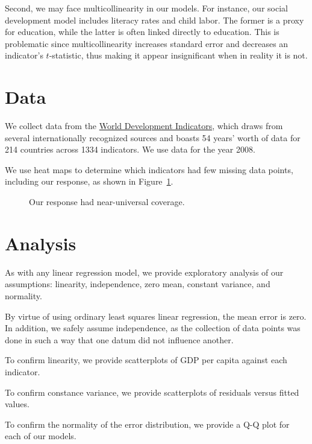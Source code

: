 \documentclass[12pt]{article}
\begin{document}
Second, we may face multicollinearity in our models. For instance, our social development model includes literacy rates and child labor. The former is a proxy for education, while the latter is often linked directly to education. This is problematic since multicollinearity increases standard error and decreases an indicator's $t$-statistic, thus making it appear insignificant when in reality it is not.




\section{Data}
We collect data from the \href{http://data.worldbank.org/indicator}{World Development Indicators}, 
which draws from several internationally recognized sources and boasts 54 years' worth of data for 214 countries across 1334 indicators.
We use data for the year 2008.\endnotemark[1]

We use heat maps to determine which indicators had few missing data points, including our response, as shown in Figure~\ref{gdp_per_capita_heat_map}.

\begin{figure}[h!]
\centering
\caption{\label{gdp_per_capita_heat_map}Our response had near-universal coverage.}
\end{figure}



\section{Analysis}
As with any linear regression model, we provide exploratory analysis of our assumptions: linearity, independence, zero mean, constant variance, and normality.

By virtue of using ordinary least squares linear regression, the mean error is zero. In addition, we safely assume independence, as the collection of data points was done in such a way that one datum did not influence another.

To confirm linearity, we provide scatterplots of GDP per capita against each indicator.

To confirm constance variance, we provide scatterplots of residuals versus fitted values.

To confirm the normality of the error distribution, we provide a Q-Q plot for each of our models.
\end{document}
